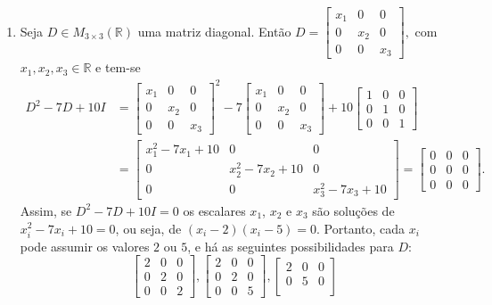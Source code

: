 \documentclass[12pt,a4paper]{article}
\newcommand*\R{\mathbb{R}}
\begin{document}
\begin{enumerate}
\item Seja $D \in M_{3 \times 3} (\R)$ uma matriz diagonal. Então
$
D = \begin{bmatrix}
x_1 & 0 & 0\\
0 & x_2 & 0\\
0 & 0 & x_3
\end{bmatrix},
$
com $x_1, x_2, x_3 \in \R$
e tem-se
\begin{align*}
D^2 - 7D + 10I
& =
\begin{bmatrix}
x_1 & 0 & 0\\
0 & x_2 & 0\\
0 & 0 & x_3
\end{bmatrix}^2
-7
\begin{bmatrix}
x_1 & 0 & 0\\
0 & x_2 & 0\\
0 & 0 & x_3
\end{bmatrix}
+10
\begin{bmatrix}
1 & 0 & 0\\
0 & 1 & 0\\
0 & 0 & 1
\end{bmatrix} \\
& =
\begin{bmatrix}
x_1^2 - 7x_1 + 10& 0 & 0\\
0 & x_2^2 - 7x_2 + 10 & 0\\
0 & 0 & x_3^2 - 7x_3 + 10
\end{bmatrix}
=
\begin{bmatrix}
0 & 0 & 0\\
0 & 0 & 0\\
0 & 0 & 0
\end{bmatrix}.
\end{align*}
Assim, se $D^2 - 7D + 10I = 0$ os escalares $x_1$, $x_2$ e $x_3$ são soluções de $x_i^2 - 7x_i + 10 = 0$, ou seja, de $(x_i-2)(x_i-5)=0$. Portanto, cada $x_i$ pode assumir os valores $2$ ou $5$, e há as seguintes possibilidades para $D$:
{\footnotesize
\[
\begin{bmatrix}
2 & 0 & 0\\
0 & 2 & 0\\
0 & 0 & 2
\end{bmatrix},
\begin{bmatrix}
2 & 0 & 0\\
0 & 2 & 0\\
0 & 0 & 5
\end{bmatrix},
\begin{bmatrix}
2 & 0 & 0\\
0 & 5 & 0\\

\end{bmatrix}\]}
\end{enumerate}
\end{document}
